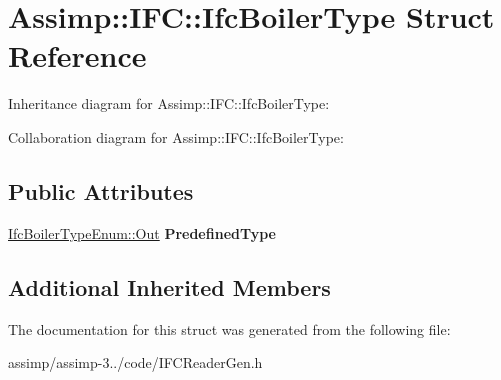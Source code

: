 \hypertarget{struct_assimp_1_1_i_f_c_1_1_ifc_boiler_type}{\section{Assimp\+:\+:I\+F\+C\+:\+:Ifc\+Boiler\+Type Struct Reference}
\label{struct_assimp_1_1_i_f_c_1_1_ifc_boiler_type}
}


Inheritance diagram for Assimp\+:\+:I\+F\+C\+:\+:Ifc\+Boiler\+Type\+:


Collaboration diagram for Assimp\+:\+:I\+F\+C\+:\+:Ifc\+Boiler\+Type\+:
\subsection*{Public Attributes}
\begin{DoxyCompactItemize}
\item 
\hypertarget{struct_assimp_1_1_i_f_c_1_1_ifc_boiler_type_a36218205d137be317f72b48204cec55f}{\hyperlink{classboost_1_1shared__ptr}{Ifc\+Boiler\+Type\+Enum\+::\+Out} {\bfseries Predefined\+Type}}\label{struct_assimp_1_1_i_f_c_1_1_ifc_boiler_type_a36218205d137be317f72b48204cec55f}

\end{DoxyCompactItemize}
\subsection*{Additional Inherited Members}


The documentation for this struct was generated from the following file\+:\begin{DoxyCompactItemize}
\item 
assimp/assimp-\/3../code/I\+F\+C\+Reader\+Gen.\+h\end{DoxyCompactItemize}
